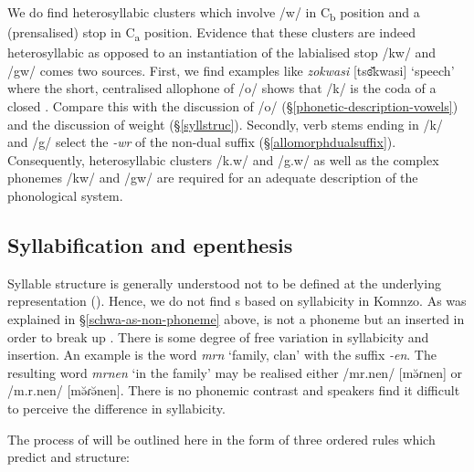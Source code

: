 We do find heterosyllabic clusters which involve /w/ in C\textsubscript{b} position and a  (prensalised) stop in  C\textsubscript{a} position. Evidence that these clusters are indeed heterosyllabic as opposed to an instantiation of the labialised  stop /kw/ and /gw/ comes two sources. First, we find examples like \emph{zokwasi} [tsɞ̆kwasi] `speech' where the short, centralised allophone of /o/ shows that /k/ is the coda of a closed . Compare this with the discussion of /o/ (\S{}\ref{phonetic-description-vowels}) and the discussion of  weight (\S{}\ref{syllstruc}). Secondly, verb stems ending in /k/ and /g/ select the \emph{-wr}  of the non-dual suffix (\S{}\ref{allomorphdualsuffix}). Consequently, heterosyllabic clusters /k.w/ and /g.w/ as well as the complex phonemes /kw/ and /gw/ are required for an adequate description of the phonological system.
\vspace{.2cm}
\subsection{Syllabification and epenthesis} \label{syllabificationandepenthesis}
\vspace{.2cm}
Syllable structure is generally understood not to be defined at the underlying representation (\citealt[221]{Blevins:1995tt}). Hence, we do not find s based on syllabicity in Komnzo. As was explained in \S{}\ref{schwa-as-non-phoneme} above,  is not a phoneme but an  inserted in order to break up . There is some degree of free variation in syllabicity and  insertion. An example is the word \emph{mrn} `family, clan' with the  suffix \emph{-en}. The resulting word \emph{mrnen} `in the family' may be realised either /mr.nen/ [mə̆ɾnen] or /m.r.nen/ [mə̆ɾə̆nen]. There is no phonemic contrast and speakers find it difficult to perceive the difference in syllabicity.%

The process of  will be outlined here in the form of three ordered rules which predict  and  structure:

